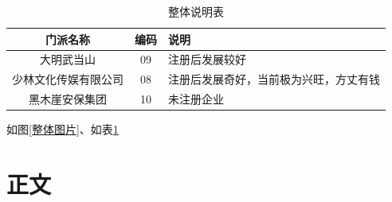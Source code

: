 \documentclass[12pt]{article}
\begin{document}
\begin{table}[H]
  \centering  %
  \caption{整体说明表}  %
	\label{整体说明表}  %
  \begin{tabularx}{\textwidth}{|c|c|X|}
    \hline
    门派名称 & 编码 & 说明\\
    \hline
    大明武当山 & 09 & 注册后发展较好\\
    \hline
    少林文化传娱有限公司 & 08 & 注册后发展奇好，当前极为兴旺，方丈有钱\\
    \hline
    黑木崖安保集团 & 10 & 未注册企业\\
    \hline
  \end{tabularx}
\end{table}

如图\ref{整体图片}、如表\ref{整体说明表}

\section{正文}
\end{document}
